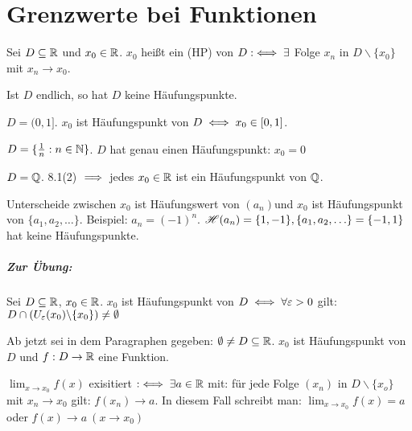 \documentclass[a4paper,twoside,DIV15,BCOR12mm]{scrbook}
\begin{document}
\chapter{Grenzwerte bei Funktionen}

\begin{definition}[Häufungspunkt]
Sei $D\subseteq\mathbb{R}$ und $x_0 \in\mathbb{R}$. $x_0$ heißt ein  (HP) von $D :\iff \exists$ Folge $x_n$ in $D\backslash \{x_0\}$ mit $x_n \to x_0$.
\end{definition}

\begin{beispiele}
\item Ist $D$ endlich, so hat $D$ keine Häufungspunkte.
\item $D = (0,1]$. $x_0$ ist Häufungspunkt von $D \iff x_0 \in [0,1]$.
\item $D = \{\frac{1}{n}: n\in\mathbb{N}\}$. $D$ hat genau einen Häufungspunkt: $x_0 = 0$
\item $D = \mathbb{Q}$. 8.1(2) $\implies$ jedes $x_0 \in\mathbb{R}$ ist ein Häufungspunkt von $\mathbb{Q}$.
\end{beispiele}

\begin{bemerkung}
Unterscheide zwischen \glqq $x_0$ ist Häufungswert von $(a_n)$\grqq und \glqq $x_0$ ist Häufungspunkt von $\{a_1,a_2,\ldots\}$\grqq. Beispiel: $a_n=(-1)^n$. $\mathscr{H}(a_n) = \{1,-1\}, \{a_1,a_2,\ldots\} = \{-1,1\}$ hat keine Häufungspunkte.
\end{bemerkung}

\paragraph{Zur Übung:} Sei $D\subseteq\mathbb{R}$, $x_0 \in\mathbb{R}$. $x_0$ ist Häufungspunkt von $D \iff \forall\varepsilon>0$ gilt: $D\cap(U_\varepsilon(x_0) \backslash\{x_0\}) \ne \emptyset$

\begin{vereinbarung}
Ab jetzt sei in dem Paragraphen gegeben: $\emptyset \ne D \subseteq \mathbb{R}$. $x_0$ ist Häufungspunkt von $D$ und $f: D \to \mathbb{R}$ eine Funktion.
\end{vereinbarung}

\begin{definition}
$\displaystyle\lim_{x\to x_0}f(x)$ exisitiert $:\iff \exists a\in\mathbb{R}$ mit: für jede Folge $(x_n)$ in $D\backslash\{x_o\}$ mit $x_n \to x_0$ gilt: $f(x_n) \to a$. In diesem Fall schreibt man: $\displaystyle\lim_{x\to x_0}f(x) = a$ oder $f(x) \to a \ (x\to x_0)$
\end{definition}
\end{document}
